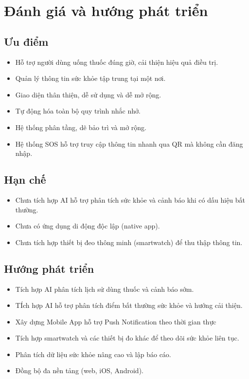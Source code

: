 \documentclass[12pt,a4paper]{report}
\begin{document}
\chapter{Đánh giá và hướng phát triển}

\section{Ưu điểm}

\begin{itemize}[leftmargin=1.5em, itemsep=2pt]
  \item Hỗ trợ người dùng uống thuốc đúng giờ, cải thiện hiệu quả điều trị.
  \item Quản lý thông tin sức khỏe tập trung tại một nơi.
  \item Giao diện thân thiện, dễ sử dụng và dễ mở rộng.
  \item Tự động hóa toàn bộ quy trình nhắc nhở.
  \item Hệ thống phân tầng, dẽ bảo trì và mở rộng.
  \item Hệ thống SOS hỗ trợ truy cập thông tin nhanh qua QR mà không cần đăng nhập.
\end{itemize}

\section{Hạn chế}

\begin{itemize}[leftmargin=1.5em, itemsep=2pt]
  \item Chưa tích hợp AI hỗ trợ phân tích sức khỏe và cảnh báo khi có dấu hiệu bất thường.
  \item Chưa có ứng dụng di động độc lập (native app).
  \item Chưa tích hợp thiết bị đeo thông minh (smartwatch) để thu thập thông tin.
\end{itemize}

\section{Hướng phát triển}

\begin{itemize}[leftmargin=1.5em, itemsep=2pt]
  \item Tích hợp AI phân tích lịch sử dùng thuốc và cảnh báo sớm.
  \item TÍch hợp AI hỗ trợ phân tích điểm bất thường sức khỏe và hướng cải thiện.
  \item Xây dựng Mobile App hỗ trợ Push Notification theo thời gian thực
  \item Tích hợp smartwatch và các thiết bị đo khác để theo dõi sức khỏe liên tục.
  \item Phân tích dữ liệu sức khỏe nâng cao và lập báo cáo.
  \item Đồng bộ đa nền tảng (web, iOS, Android).
\end{itemize}
\end{document}
